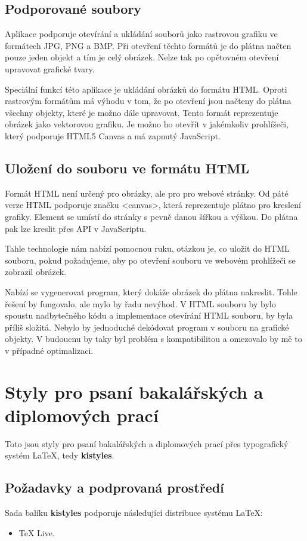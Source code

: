 \documentclass[
  field=inf,
  biblatex,
  glossaries,
  index
]{kidiplom}
\begin{document}
\subsection{Podporované soubory}

Aplikace podporuje otevírání a ukládání souborů jako rastrovou grafiku ve formátech JPG, PNG a BMP. Při otevření těchto formátů je do plátna načten pouze jeden objekt a tím je celý obrázek. Nelze tak po opětovném otevření upravovat grafické tvary. 

Speciální funkcí této aplikace je ukládání obrázků do formátu HTML. Oproti rastrovým formátům má výhodu v tom, že po otevření jsou načteny do plátna všechny objekty, které je možno dále upravovat. Tento formát reprezentuje obrázek jako vektorovou grafiku. Je možno ho otevřít v jakémkoliv prohlížeči, který podporuje HTML5 Canvas a má zapnutý JavaScript.

\subsection{Uložení do souboru ve formátu HTML}

Formát HTML není určený pro obrázky, ale pro pro webové stránky. Od páté verze HTML podporuje značku <canvas>, která reprezentuje plátno pro kreslení grafiky. Element se umístí do stránky s pevně danou šířkou a výškou. Do plátna pak lze kreslit přes 
API v JavaScriptu.

Tahle technologie nám nabízí pomocnou ruku, otázkou je, co uložit do HTML souboru, pokud požadujeme, aby po otevření souboru ve webovém prohlížeči se zobrazil obrázek.

Nabízí se vygenerovat program, který dokáže obrázek do plátna nakreslit. Tohle řešení by fungovalo, ale mylo by řadu nevýhod. V HTML souboru by bylo spoustu nadbytečného kódu a implementace otevírání HTML souboru, by byla příliš složitá. Nebylo by jednoduché dekódovat program v souboru na grafické objekty. V budoucnu by taky byl problém s kompatibilitou a omezovalo by mě to v případné optimalizaci.


\section{Styly pro psaní bakalářských a diplomových prací}
Toto jsou styly pro psaní bakalářských a diplomových prací přes typografický systém \LaTeX{}, tedy \textbf{kistyles}.

\subsection{Požadavky a podprovaná prostředí}
Sada balíku \textbf{kistyles} podporuje následující distribuce systému \LaTeX{}:
\begin{itemize}
\item \TeX{} Live.
\end{itemize}
\end{document}
